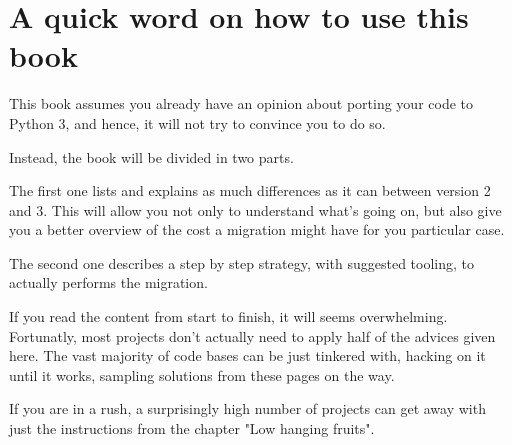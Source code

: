 
\chapter{A quick word on how to use this book}

This book assumes you already have an opinion about porting your code to Python 3, and hence, it will not try to convince you to do so.

Instead, the book will be divided in two parts.

The first one lists and explains as much differences as it can between version 2 and 3. This will allow you not only to understand what's going on, but also give you a better overview of the cost a migration might have for you particular case.

The second one describes a step by step strategy, with suggested tooling, to actually performs the migration.

If you read the content from start to finish, it will seems overwhelming. Fortunatly, most projects  don't actually need to apply half of the advices given here. The vast majority of code bases can be just tinkered with, hacking on it until it works, sampling solutions from these pages on the way.

If you are in a rush, a surprisingly high number of projects can get away with just the instructions from the chapter "Low hanging fruits".
